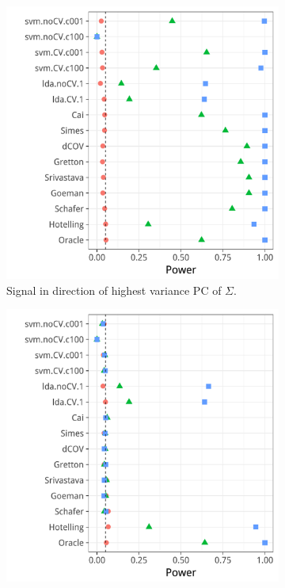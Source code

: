 \documentclass[journal]{IEEEtran}
\begin{document}
\begin{figure}[h]
	\centering
	\caption{Arbitrary Correlation. 
		$\Sigma=D^{-1} R D^{-1}$ where $D$ is diagonal with $D_{jj}=\sqrt{R_{jj}}$, and $R=A'A$ where $A$ is a Gaussian $p\times p$ random matrix with independent $\mathcal{N}(0,1)$ entries.
	}
	\label{fig:dependence_3}
	\begin{subfigure}[t]{.45\columnwidth}
		\centering
		\includegraphics[width=1\columnwidth]{"art/file18"}
		\caption{Signal in direction of highest variance PC of $\Sigma$.} 
		\label{fig:dependence_31}
	\end{subfigure}
	\begin{subfigure}[t]{.45\columnwidth}
		\centering
		\includegraphics[width=1\columnwidth]{"art/file17"}

\end{subfigure}
\end{figure}
\end{document}
